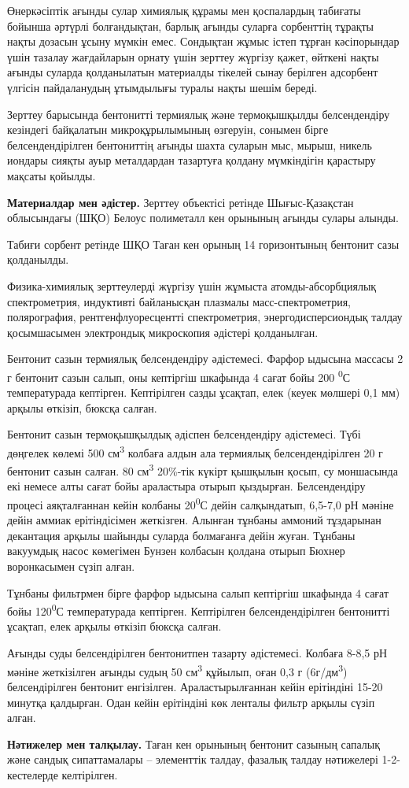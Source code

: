 \begin{multicols}{2}
Өнеркәсіптік ағынды сулар химиялық құрамы мен қоспалардың табиғаты
бойынша әртүрлі болғандықтан, барлық ағынды суларға сорбенттің тұрақты
нақты дозасын ұсыну мүмкін емес. Сондықтан жұмыс істеп тұрған
кәсіпорындар үшін тазалау жағдайларын орнату үшін зерттеу жүргізу қажет,
өйткені нақты ағынды суларда қолданылатын материалды тікелей сынау
берілген адсорбент үлгісін пайдаланудың ұтымдылығы туралы нақты шешім
береді.

Зерттеу барысында бентонитті термиялық және термоқышқылды белсендендіру
кезіндегі байқалатын микроқұрылымының өзгеруін, сонымен бірге
белсендендірілген бентониттің ағынды шахта суларын мыс, мырыш, никель
иондары сияқты ауыр металдардан тазартуға қолдану мүмкіндігін қарастыру
мақсаты қойылды.

{\bfseries Материалдар мен әдістер.} Зерттеу объектісі ретінде
Шығыс-Қазақстан облысындағы (ШҚО) Белоус полиметалл кен орынының ағынды
сулары алынды.

Табиғи сорбент ретінде ШҚО Таған кен орының 14 горизонтының бентонит
сазы қолданылды.

Физика-химиялық зерттеулерді жүргізу үшін жұмыста атомды-абсорбциялық
спектрометрия, индуктивті байланысқан плазмалы масс-спектрометрия,
полярография, рентгенфлуоресцентті спектрометрия, энергодисперсиондық
талдау қосымшасымен электрондық микроскопия әдістері қолданылған.

Бентонит сазын термиялық белсендендіру әдістемесі. Фарфор ыдысына
массасы 2 г бентонит сазын салып, оны кептіргіш шкафында 4 сағат бойы
200 \textsuperscript{0}С температурада кептірген. Кептірілген сазды
ұсақтап, елек (кеуек мөлшері 0,1 мм) арқылы өткізіп, бюксқа салған.

Бентонит сазын термоқышқылдық әдіспен белсендендіру әдістемесі. Түбі
дөңгелек көлемі 500 см\textsuperscript{3} колбаға алдын ала термиялық
белсендендірілген 20 г бентонит сазын салған. 80 см\textsuperscript{3}
20\%-тік күкірт қышқылын қосып, су моншасында екі немесе алты сағат бойы
араластыра отырып қыздырған. Белсендендіру процесі аяқталғаннан кейін
колбаны 20\textsuperscript{0}С дейін салқындатып, 6,5-7,0 рН мәніне
дейін аммиак ерітіндісімен жеткізген. Алынған тұнбаны аммоний тұздарынан
декантация арқылы шайынды суларда болмағанға дейін жуған. Тұнбаны
вакуумдық насос көмегімен Бунзен колбасын қолдана отырып Бюхнер
воронкасымен сүзіп алған.

Тұнбаны фильтрмен бірге фарфор ыдысына салып кептіргіш шкафында 4 сағат
бойы 120\textsuperscript{0}С температурада кептірген. Кептірілген
белсендендірілген бентонитті ұсақтап, елек арқылы өткізіп бюксқа салған.

Ағынды суды белсендірілген бентонитпен тазарту әдістемесі. Колбаға 8-8,5
рН мәніне жеткізілген ағынды судың 50 см\textsuperscript{3} құйылып,
оған 0,3 г (6г/дм\textsuperscript{3}) белсендірілген бентонит
енгізілген. Араластырылғаннан кейін ерітіндіні 15-20 минутқа қалдырған.
Одан кейін ерітіндіні көк ленталы фильтр арқылы сүзіп алған.

{\bfseries Нәтижелер мен талқылау.} Таған кен орынының бентонит сазының
сапалық және сандық сипаттамалары -- элементтік талдау, фазалық талдау
нәтижелері 1-2-кестелерде келтірілген.
\end{multicols}


